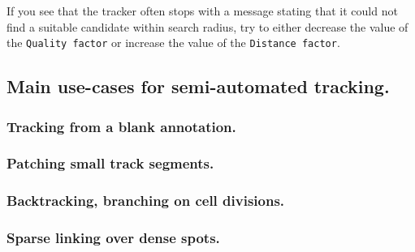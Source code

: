 \noindent If you see that the tracker often stops with a message stating that it could not find a suitable candidate within search radius, try to either decrease  the value of the \texttt{Quality factor} or increase the value of the \texttt{Distance factor}.



\subsection{Main use-cases for semi-automated tracking.}

\subsubsection{Tracking from a blank annotation. }

\subsubsection{Patching small track segments.}

\subsubsection{Backtracking, branching on cell divisions. }

\subsubsection{Sparse linking over dense spots.}
